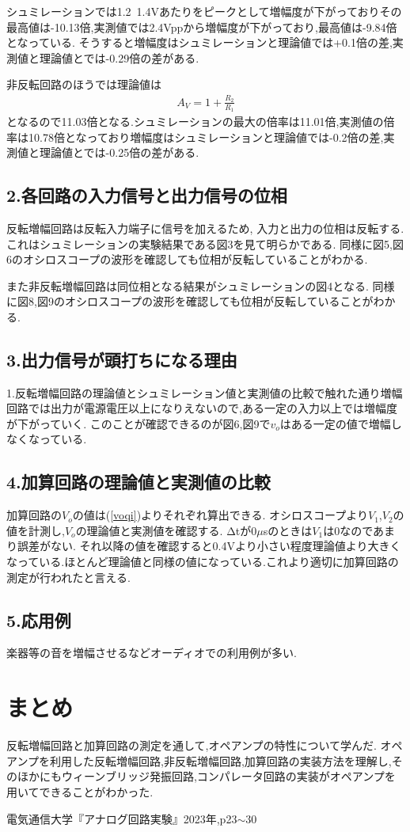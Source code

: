 \documentclass[a4j,10pt,dvipdfmx]{jarticle}
\begin{document}
シュミレーションでは1.2~1.4Vあたりをピークとして増幅度が下がっておりその最高値は-10.13倍,実測値では2.4Vppから増幅度が下がっており,最高値は-9.84倍となっている.
そうすると増幅度はシュミレーションと理論値では+0.1倍の差,実測値と理論値とでは-0.29倍の差がある.

非反転回路のほうでは理論値は
\begin{eqnarray}
  \label{A2}
A_V=1+\frac{R_2}{R_1}
\end{eqnarray}
となるので11.03倍となる.シュミレーションの最大の倍率は11.01倍,実測値の倍率は10.78倍となっており増幅度はシュミレーションと理論値では-0.2倍の差,実測値と理論値とでは-0.25倍の差がある.
\subsection{2.各回路の入力信号と出力信号の位相}
反転増幅回路は反転入力端子に信号を加えるため, 入力と出力の位相は反転する.これはシュミレーションの実験結果である図3を見て明らかである.
同様に図5,図6のオシロスコープの波形を確認しても位相が反転していることがわかる.

また非反転増幅回路は同位相となる結果がシュミレーションの図4となる.
同様に図8,図9のオシロスコープの波形を確認しても位相が反転していることがわかる.
\subsection{3.出力信号が頭打ちになる理由}
1.反転増幅回路の理論値とシュミレーション値と実測値の比較で触れた通り増幅回路では出力が電源電圧以上になりえないので,ある一定の入力以上では増幅度が下がっていく.
このことが確認できるのが図6,図9で$v_o$はある一定の値で増幅しなくなっている.
\subsection{4.加算回路の理論値と実測値の比較}
加算回路の$V_o$の値は(\ref{voqi})よりそれぞれ算出できる.
オシロスコープより$V_1$,$V_2$の値を計測し,$V_o$の理論値と実測値を確認する.
Δtが0$\mu$sのときは$V_1$は0なのであまり誤差がない.
それ以降の値を確認すると0.4Vより小さい程度理論値より大きくなっている.ほとんど理論値と同様の値になっている.これより適切に加算回路の測定が行われたと言える.
\subsection{5.応用例}
楽器等の音を増幅させるなどオーディオでの利用例が多い.
\section{まとめ}
反転増幅回路と加算回路の測定を通して,オペアンプの特性について学んだ.
オペアンプを利用した反転増幅回路,非反転増幅回路,加算回路の実装方法を理解し,そのほかにもウィーンブリッジ発振回路,コンパレータ回路の実装がオペアンプを用いてできることがわかった.

\begin{thebibliography}{9}
   電気通信大学『アナログ回路実験』2023年,p23$\sim$30
 
\end{thebibliography}
\end{document}
